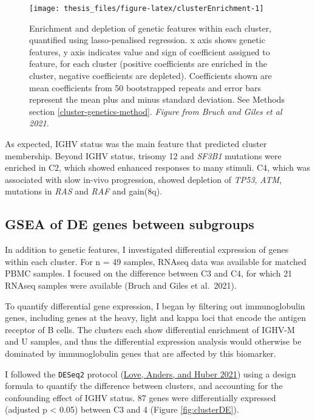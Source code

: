 \documentclass[11pt, a4paper, twosided]{book}
\begin{document}
\begin{figure}

{\centering \texttt{[image: thesis\_files/figure-latex/clusterEnrichment-1]} 

}

\caption{Enrichment and depletion of genetic features within each cluster, quantified using lasso-penalised regression. x axis shows genetic features, y axis indicates value and sign of coefficient assigned to feature, for each cluster (positive coefficients are enriched in the cluster, negative coefficients are depleted). Coefficients shown are mean coefficients from 50 bootstrapped repeats and error bars represent the mean plus and minus standard deviation. See Methods section \ref{cluster-genetics-method}. \emph{Figure from Bruch and Giles et al 2021. }}\label{fig:clusterEnrichment}
\end{figure}
As expected, IGHV status was the main feature that predicted cluster membership. Beyond IGHV status, trisomy 12 and \emph{SF3B1} mutations were enriched in C2, which showed enhanced responses to many stimuli. C4, which was associated with slow in-vivo progression, showed depletion of \emph{TP53}, \emph{ATM}, mutations in \emph{RAS} and \emph{RAF} and gain(8q).

\hypertarget{cluster-rna}{%
\subsection{GSEA of DE genes between subgroups}\label{cluster-rna}}

In addition to genetic features, I investigated differential expression of genes within each cluster. For n = 49 samples, RNAseq data was available for matched PBMC samples. I focused on the difference between C3 and C4, for which 21 RNAseq samples were available (Bruch and Giles et al.~2021).

To quantify differential gene expression, I began by filtering out immunoglobulin genes, including genes at the heavy, light and kappa loci that encode the antigen receptor of B cells. The clusters each show differential enrichment of IGHV-M and U samples, and thus the differential expression analysis would otherwise be dominated by immunoglobulin genes that are affected by this biomarker.

I followed the \texttt{DESeq2} protocol (\protect\hyperlink{ref-R-DESeq2}{Love, Anders, and Huber 2021}) using a design formula to quantify the difference between clusters, and accounting for the confounding effect of IGHV status. 87 genes were differentially expressed (adjusted p \textless{} 0.05) between C3 and 4 (Figure \ref{fig:clusterDE}).
\end{document}
